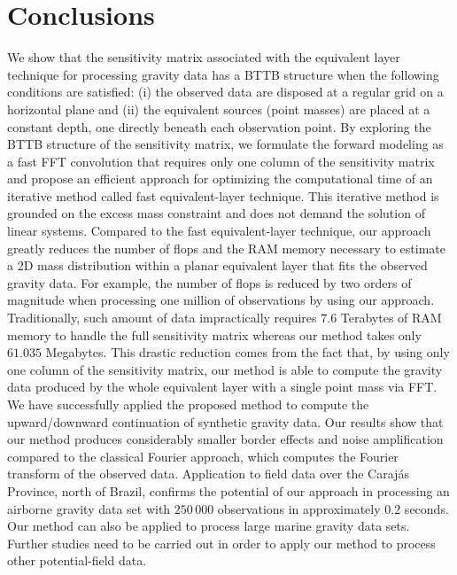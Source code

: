 \section{Conclusions}

We show that the sensitivity matrix associated with the equivalent layer technique 
for processing gravity data has a BTTB structure when the following conditions are
satisfied: (i) the observed data are disposed at a regular grid on a horizontal plane
and (ii) the equivalent sources (point masses) are placed at a constant depth, one directly 
beneath each observation point.
By exploring the BTTB structure of the sensitivity matrix, we formulate the forward modeling as a 
fast FFT convolution that requires only one column of the sensitivity matrix 
and propose an efficient approach for optimizing the computational time of an 
iterative method called fast equivalent-layer technique.
This iterative method is grounded on the excess mass constraint and does not demand the solution of 
linear systems.
Compared to the fast equivalent-layer technique, 
our approach greatly reduces the number of flops and the RAM memory necessary to estimate a 
2D mass distribution within a planar equivalent layer that fits the observed gravity data. 
For example, the number of flops is reduced by two orders 
of magnitude when processing one million of observations by using our approach. 
Traditionally, such amount of data impractically requires $7.6$ Terabytes of RAM memory to handle 
the full sensitivity matrix whereas our method takes only $61.035$ Megabytes.
This drastic reduction comes from the fact that, by using only one column of the sensitivity matrix,
our method is able to compute the gravity data produced by the whole equivalent layer with a single 
point mass via FFT.
We have successfully applied the proposed method to compute the upward/downward continuation of 
synthetic gravity data. 
Our results show that our method produces considerably smaller border effects and 
noise amplification compared to the classical Fourier approach, 
which computes the Fourier transform of the observed data.
Application to field data over the Caraj{\'a}s Province, north of Brazil, 
confirms the potential of our approach in processing an airborne gravity data set with $250\,000$ observations in approximately $0.2$ seconds. 
Our method can also be applied to process large marine gravity data sets. 
Further studies need to be carried out in order to apply our method to process 
other potential-field data.